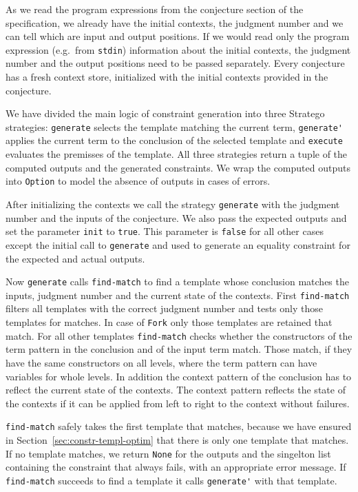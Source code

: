 As we read the program expressions from the conjecture section of the
specification, we already have the initial contexts, the judgment
number and we can tell which are input and output positions. If we
would read only the program expression (e.g.\ from \verb|stdin|)
information about the initial contexts, the judgment number and the
output positions need to be passed separately. Every conjecture has a
fresh context store, initialized with the initial contexts provided in
the conjecture.

We have divided the main logic of constraint generation into three
Stratego strategies: \verb|generate| selects the template matching the
current term, \verb|generate'| applies the current term to the
conclusion of the selected template and \verb|execute| evaluates the
premisses of the template. All three strategies return a tuple of the
computed outputs and the generated constraints. We wrap the computed
outputs into \verb|Option| to model the absence of outputs in cases of
errors.

After initializing the contexts we call the strategy \verb|generate|
with the judgment number and the inputs of the conjecture. We also
pass the expected outputs and set the parameter \verb|init| to
\verb|true|. This parameter is \verb|false| for all other cases except
the initial call to \verb|generate| and used to generate an equality
constraint for the expected and actual outputs.

Now \verb|generate| calls \verb|find-match| to find a template whose
conclusion matches the inputs, judgment number and the current state
of the contexts. First \verb|find-match| filters all templates with the
correct judgment number and tests only those templates for matches. In
case of \verb|Fork| only those templates are retained that match. For
all other templates \verb|find-match| checks whether the constructors
of the term pattern in the conclusion and of the input term
match. Those match, if they have the same constructors on all levels,
where the term pattern can have variables for whole levels. In
addition the context pattern of the conclusion has to reflect the
current state of the contexts. The context pattern reflects the state
of the contexts if it can be applied from left to right to the context
without failures.

\verb|find-match| safely takes the first template that matches,
because we have ensured in Section~\ref{sec:constr-templ-optim} that
there is only one template that matches. If no template matches, we
return \verb|None| for the outputs and the singelton list containing
the constraint that always fails, with an appropriate error
message. If \verb|find-match| succeeds to find a template it calls
\verb|generate'| with that template.

